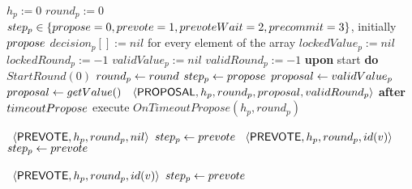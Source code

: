 \begin{algorithm}[htb!]
\def\baselinestretch{1}
\scriptsize\raggedright
\begin{algorithmic}[1]
	\SHORTSPACE
\INIT{}
\STATE $h_p := 0$ 
\STATE $round_p := 0$    
\STATE $step_p  \in \left\{propose=0, prevote=1, prevoteWait=2, precommit=3\right\}$, initially $propose$  
\STATE $decision_p[] := nil$ for every element of the array
\STATE $lockedValue_p := nil$
\STATE $lockedRound_p := -1$ 
\STATE $validValue_p := nil$
\STATE $validRound_p := -1$
\ENDINIT
\SHORTSPACE
\STATE \textbf{upon} start \textbf{do}  $StartRound(0)$
\SHORTSPACE
{} \label{line:tab:startRound}
	\STATE	$round_p \leftarrow round$
	\STATE	$step_p \leftarrow propose$
		 \label{line:tab:isThereLockedValue}
			\STATE $proposal \leftarrow validValue_p$
		\ELSE
			\STATE $proposal \leftarrow getValue()$ \label{line:tab:getValidValue}
		\ENDIF 	  
		\STATE \Broadcast\ $\langle\mathsf{PROPOSAL},h_p, round_p, proposal, validRound_p\rangle$  \label{line:tab:send-proposal}
	\ELSE
		\STATE \textbf{after} $timeoutPropose$ execute $OnTimeoutPropose(h_p, round_p)$ 
	\ENDIF
\ENDFUNCTION

\SPACE
{} \label{line:tab:recvProposal}			
   \label{line:tab:acceptProposal1}		
 	\STATE \Broadcast \ $\langle\mathsf{PREVOTE},h_p,round_p,nil\rangle$  \label{line:tab:prevote-nil}	
 	\STATE $step_p \leftarrow prevote$ \label{line:tab:setStateToPrevote1} 
 	\STATE \Broadcast \ $\langle\mathsf{PREVOTE},h_p,round_p,id(v)\rangle$  \label{line:tab:prevote-proposal}	
 	\STATE $step_p \leftarrow prevote$ \label{line:tab:setStateToPrevote2} 
 \ENDIF
\ENDUPON

\SPACE
{} \label{line:tab:acceptProposal}
	 \label{line:tab:cond-prevote-higher-proposal}	
		\STATE \Broadcast \ $\langle\mathsf{PREVOTE},h_p,round_p,id(v)\rangle$  \label{line:tab:prevote-higher-proposal}	
		\STATE $step_p \leftarrow prevote$ \label{line:tab:setStateToPrevote3} 		 
	\ENDIF
\ENDUPON


\end{algorithmic}
\end{algorithm}
